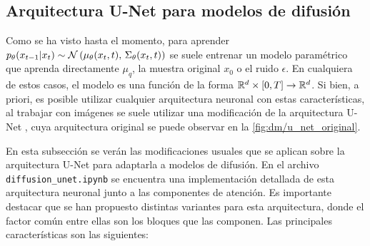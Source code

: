 

\subsection{Arquitectura U-Net para modelos de difusión}
\label{dm/discrete_dm/unet}

Como se ha visto hasta el momento, para aprender $p_\theta(x_{t-1}|x_t)\sim\mathcal{N}\left(\mu_\theta(x_t,t),\,\Sigma_\theta(x_t,t)\right)$ se suele entrenar un modelo paramétrico que aprenda directamente $\mu_q$, la muestra original $x_0$ o el ruido $\epsilon$. En cualquiera de estos casos, el modelo es una función de la forma $\mathbb{R}^d\times [0,T]\to\mathbb{R}^d$. Si bien, a priori, es posible utilizar cualquier arquitectura neuronal con estas características, al trabajar con imágenes se suele utilizar una modificación de la arquitectura U-Net \cite{ronneberger2015unet}, cuya arquitectura original se puede observar en la \autoref{fig:dm/u_net_original}.


En esta subsección se verán las modificaciones usuales que se aplican sobre la arquitectura U-Net para adaptarla a modelos de difusión. En el archivo \texttt{diffusion\_unet.ipynb} se encuentra una implementación detallada de esta arquitectura neuronal junto a las componentes de atención. Es importante destacar que se han propuesto distintas variantes para esta arquitectura, donde el factor común entre ellas son los bloques que las componen. Las principales características son las siguientes:

